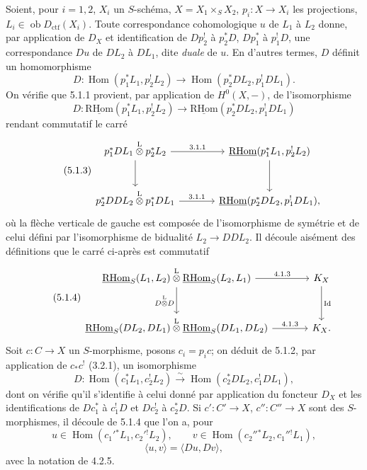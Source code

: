 \documentclass[11pt]{article}
\DeclareMathOperator{\Hom}{Hom}
\newcommand{\R}{\mathrm{R}}\newcommand{\RHomCore}{\mathrm{RHom}}
\providecommand{\RHom}{\RHomCore}
\providecommand{\uRHom}{\underline{\RHom}}
\providecommand{\RHom}{\RHomCore}
\providecommand{\Hom}{\operatorname{Hom}}
\providecommand{\RHom}{\R\mathcal{H}om}
\providecommand{\R}{\mathrm R}
\providecommand{\RHom}{\RHomCore}
\providecommand{\Hom}{\operatorname{Hom}}
\begin{document}
Soient, pour $i=1,2$, $X_i$ un $S$-schéma, $X=X_1\times_S X_2$, $p_i:X\to X_i$ les projections, $L_i\in\operatorname{ob}D_{\mathrm{ctf}}(X_i)$. Toute correspondance cohomologique $u$ de $L_1$ à $L_2$ donne, par application de $D_X$ et identification de $Dp_2^!$ à $p_2^*D$, $Dp_1^*$ à $p_1^!D$, une correspondance $Du$ de $DL_2$ à $DL_1$, dite \emph{duale} de $u$. En d'autres termes, $D$ définit un homomorphisme
\begin{equation}
\tag{5.1.1}
D:\Hom(p_1^*L_1,p_2^!L_2)\longrightarrow \Hom(p_2^*DL_2,p_1^!DL_1).
\end{equation}
On vérifie que 5.1.1 provient, par application de $H^0(X,-)$, de l'isomorphisme
\begin{equation}
\tag{5.1.2}
D:\uRHom(p_1^*L_1,p_2^!L_2)\longrightarrow\uRHom(p_2^*DL_2,p_1^!DL_1)
\end{equation}
rendant commutatif le carré
\begin{equation}
\tag{5.1.3}
\begin{tikzcd}[column sep=large,row sep=large]
p_1^*DL_1\overset{\mathrm{L}}{\otimes}p_2^*L_2 \arrow[r,"3.1.1"] \arrow[d]
& \uRHom(p_1^*L_1,p_2^!L_2) \arrow[d] \\
p_2^*DDL_2\overset{\mathrm{L}}{\otimes}p_1^*DL_1 \arrow[r,"3.1.1"]
& \uRHom(p_2^*DL_2,p_1^!DL_1),
\end{tikzcd}
\end{equation}
où la flèche verticale de gauche est composée de l'isomorphisme de symétrie et de celui défini par l'isomorphisme de bidualité $L_2\to DDL_2$. Il découle aisément des définitions que le carré ci-après est commutatif
\begin{equation}
\tag{5.1.4}
\begin{tikzcd}[column sep=large,row sep=large]
\uRHom_S(L_1,L_2)\overset{\mathrm{L}}{\otimes}\uRHom_S(L_2,L_1) \arrow[r,"4.1.3"] \arrow[d,"D\overset{\mathrm{L}}{\otimes} D"']
& K_X \arrow[d,"\operatorname{Id}"] \\
\uRHom_S(DL_2,DL_1)\overset{\mathrm{L}}{\otimes}\uRHom_S(DL_1,DL_2) \arrow[r,"4.1.3"]
& K_X.
\end{tikzcd}
\end{equation}
Soit $c:C\to X$ un $S$-morphisme, posons $c_i=p_ic$; on déduit de 5.1.2, par application de $c_*c^!$ (3.2.1), un isomorphisme
\begin{equation}
\tag{5.1.5}
D:\Hom(c_1^*L_1,c_2^!L_2)\xrightarrow{\sim}\Hom(c_2^*DL_2,c_1^!DL_1),
\end{equation}
dont on vérifie qu'il s'identifie à celui donné par application du foncteur $D_X$ et 
les
identifications de $Dc_1^*$ à $c_1^!D$ et $Dc_2^!$ à $c_2^*D$. Si $c':C'\to X$, $c'':C''\to X$ sont des $S$-morphismes, il découle de 5.1.4 que l'on a, pour
\[
u\in\Hom(c_1'{}^*L_1,c_2'{}^!L_2),\qquad v\in\Hom(c_2''{}^*L_2,c_1''{}^!L_1),\]
\begin{equation}
\tag{5.1.6}
\langle u,v\rangle=\langle Du,Dv\rangle,
\end{equation}
avec la notation de 4.2.5.
\end{document}
